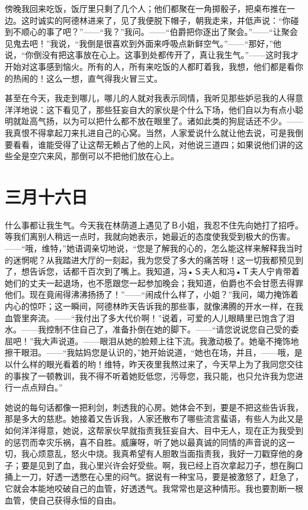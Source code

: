 \documentclass[12pt,oneside]{book}
\begin{document}
傍晚我回来吃饭，饭厅里只剩了几个人；他们都聚在一角掷骰子，把桌布推在一边。这时诚实的阿德林进来了，见了我便脱下帽子，朝我走来，并低声说：“你碰到不顺心的事了吧？”——“我？”我问。——“伯爵把你逐出了聚会。”——“让聚会见鬼去吧！”我说，“我倒是很喜欢到外面来呼吸点新鲜空气。”——“那好，”他说，“你倒没有把这事放在心上。这事到处都传开了，真让我生气。”——这时我才开始对这事感到恼火。所有的人，所有来吃饭的人都盯着我，我想，他们都是看你的热闹的！这么一想，直气得我火冒三丈。

甚至在今天，我走到哪儿，哪儿的人就对我表示同情，我听见那些妒忌我的人得意洋洋地说：这下看见了，那些狂妄自大的家伙是个什么下场，他们自以为有点小聪明就趾高气扬，以为可以把什么都不放在眼里了。诸如此类的狗屁话还不少。——我真恨不得拿起刀来扎进自己的心窝。当然，人家爱说什么就让他去说，可是我倒要看看，谁能受得了让这帮无赖占了他的上风，对他说三道四；如果说他们讲的这些全是空穴来风，那倒可以不把他们放在心上。
　　

\chapter{三月十六日}
\label{sec-3-10}
什么事都让我生气。今天我在林荫道上遇见了Ｂ小姐，我忍不住先向她打了招呼。等我们离别人稍远一点时，我就向她表示，她最近的态度使我受到极大的伤害。——“哦，维特，”她语调亲切地说，“您是了解我的心的，怎么能这样来解释我当时的迷惘呢？从我踏进大厅的一刻起，我为您受了多大的痛苦呀！这一切我都预见到了，想告诉您，话都千百次到了嘴上。我知道，冯•Ｓ夫人和冯•Ｔ夫人宁肯带着她们的丈夫一起退场，也不愿跟您一起参加晚会；我知道，伯爵也不会甘愿去得罪他们。现在竟闹得沸沸扬扬了！”——“闹成什么样了，小姐？”我问，竭力掩饰着内心的惊吓；这一瞬间，阿德林昨天告诉我的那些事，就像沸腾的开水一样，在我血管里奔流。——“我付出了多大代价啊！”说着，可爱的人儿眼睛里已饱含了泪水。——我控制不住自己了，准备扑倒在她的脚下。——“请您说说您自己受的委屈吧！”我大声说道。——眼泪从她的脸颊上往下流。我激动极了。她毫不掩饰地擦干眼泪。——“我姑妈您是认识的，”她开始说道，“她也在场，并且，——哦，是以什么样的眼光看着的哟！维特，昨天夜里我熬过来了，今天早上为了我同您交往的事挨了一顿教训，我不得不听着她贬低您，污辱您，我只能，也只允许我为您进行一点点辩白。”

她说的每句话都像一把利剑，刺透我的心房。她体会不到，要是不把这些告诉我，那是多大的慈悲。她接着又告诉我，人家还散布了哪些流言蜚语，有些人为此又是如何洋洋得意，她说，这帮家伙早就指责我狂妄自大、目中无人，现在正为我受到的惩罚而幸灾乐祸，喜不自胜。威廉呀，听了她以最真诚的同情的声音说的这一切，我心烦意乱，怒火中烧。我真希望有人胆敢当面指责我，我好一刀戳穿他的身子；要是见到了血，我心里兴许会好受些。啊，我已经上百次拿起刀子，想在胸口捅上一刀，好透一透憋在心里的闷气。据说有一种宝马，要是被激怒了，赶急了，它就会本能地咬破自己的血管，好透透气。我常常也是这种情形。我也要割断一根血管，使自己获得永恒的自由。
　　
\end{document}
